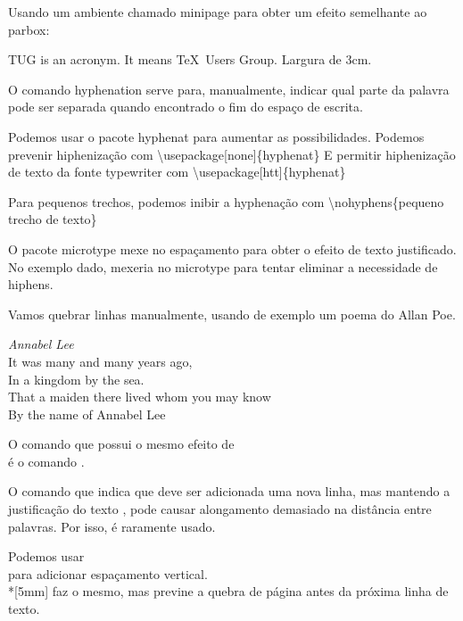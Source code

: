 \documentclass{article}
\begin{document}
Usando um ambiente chamado minipage para obter um efeito semelhante ao parbox:

\begin{minipage}{3cm}

    TUG is an acronym. It means \TeX\ Users Group. Largura de 3cm.

\end{minipage}

O comando hyphenation serve para, manualmente, indicar qual parte da palavra pode ser separada quando encontrado o fim do espaço de escrita.

Podemos usar o pacote hyphenat para aumentar as possibilidades.
Podemos prevenir hiphenização com
\textbackslash usepackage[none]\{hyphenat\}
E permitir hiphenização de texto da fonte typewriter com
\textbackslash usepackage[htt]\{hyphenat\}

Para pequenos trechos, podemos inibir a hyphenação com \textbackslash nohyphens\{pequeno trecho de texto\}

O pacote microtype mexe no espaçamento para obter o efeito de texto justificado.
No exemplo dado, mexeria no microtype para tentar eliminar a necessidade de hiphens.


Vamos quebrar linhas manualmente, usando de exemplo um poema do Allan Poe.

\emph{Annabel Lee} \\[3mm]
It was many and many years ago, \\
In a kingdom by the sea. \\
That a maiden there lived whom you may know \\
By the name of Annabel Lee

O comando que possui o mesmo efeito de \\
é o comando \newline.

O comando que indica que deve ser adicionada uma nova linha,
mas mantendo a justificação do texto \linebreak, pode causar
alongamento demasiado na distância entre palavras.
Por isso, é raramente usado.

Podemos usar \\[3mm] para adicionar espaçamento vertical.
\\*[5mm] faz o mesmo, mas previne a quebra de página antes da
próxima linha de texto.
\end{document}
